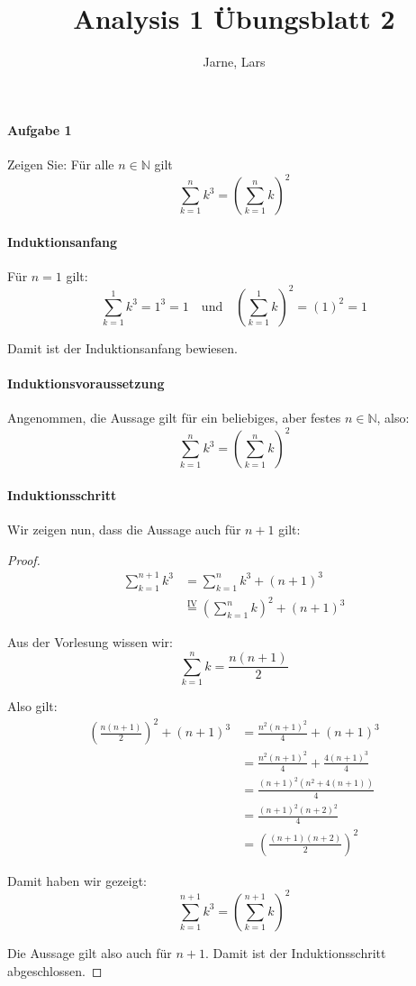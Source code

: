 \documentclass[12pt, letterpaper]{article}
\title{Analysis 1 Übungsblatt 2}
\author{Jarne, Lars}
\date{}
\begin{document}
\maketitle

\paragraph{Aufgabe 1}

Zeigen Sie: Für alle $n \in \mathbb{N}$ gilt
$$\sum_{k=1}^{n}k^3  =  \left(\sum_{k=1}^{n}k\right)^2$$

\paragraph{Induktionsanfang}

Für $n = 1$ gilt:
$$\sum_{k=1}^{1}k^3 = 1^3 = 1 \quad \text{und} \quad \left(\sum_{k=1}^{1}k\right)^2 = (1)^2 = 1$$

\noindent Damit ist der Induktionsanfang bewiesen.

\paragraph{Induktionsvoraussetzung}

Angenommen, die Aussage gilt für ein beliebiges, aber festes $n \in \mathbb{N}$, also:
$$\sum_{k=1}^{n}k^3  =  \left(\sum_{k=1}^{n}k\right)^2$$

\paragraph{Induktionsschritt}

Wir zeigen nun, dass die Aussage auch für $n+1$ gilt:

\begin{proof}
\begin{align*}
\sum_{k=1}^{n+1}k^3 &= \sum_{k=1}^{n}k^3 + (n + 1)^3 \\
&\overset{\text{IV}}{=} \left(\sum_{k=1}^{n}k\right)^2 + (n + 1)^3
\end{align*}

\noindent Aus der Vorlesung wissen wir:
$$\sum_{k=1}^{n}k = \frac{n(n + 1)}{2}$$

\noindent Also gilt:
\begin{align*}
\left(\frac{n(n + 1)}{2}\right)^2 + (n + 1)^3 
&= \frac{n^2(n + 1)^2}{4} + (n + 1)^3 \\
&= \frac{n^2(n + 1)^2}{4} + \frac{4(n + 1)^3}{4} \\
&= \frac{(n + 1)^2(n^2 + 4(n + 1))}{4} \\
&= \frac{(n + 1)^2(n + 2)^2}{4} \\
&= \left(\frac{(n + 1)(n + 2)}{2}\right)^2
\end{align*}

\noindent Damit haben wir gezeigt:
$$\sum_{k=1}^{n+1}k^3 = \left(\sum_{k=1}^{n+1}k\right)^2$$

\noindent Die Aussage gilt also auch für $n+1$. Damit ist der Induktionsschritt abgeschlossen.
\end{proof}
\end{document}

